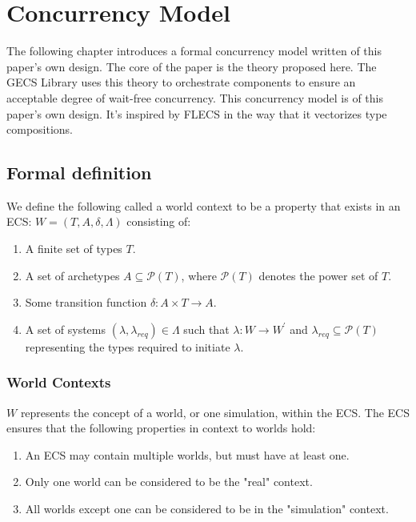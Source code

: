 
\section{Concurrency Model}
\label{chap:2}
The following chapter introduces a formal concurrency model written of this paper's own design. The core of the paper is the theory proposed here. The GECS Library uses this theory to orchestrate components to ensure an acceptable degree of wait-free concurrency. This concurrency model is of this paper's own design. It's inspired by FLECS in the way that it vectorizes type compositions.

\subsection{Formal definition} \label{section:formal_definition}
We define the following called a world context to be a property that exists in an ECS: $W = (T, A, \delta, \Lambda)$ consisting of:
\begin{enumerate}
    \item A finite set of types $T$.
    \item A set of archetypes $A \subseteq \mathcal{P}(T)$, where $\mathcal{P}(T)$ denotes the power set of $T$.
    \item Some transition function $\delta : A \times T \rightarrow A$.
    \item A set of systems $(\lambda, \lambda_{req}) \in \Lambda$ such that $\lambda : W \rightarrow W^\prime$ and $\lambda_{req} \subseteq \mathcal{P}(T)$ representing the types required to initiate $\lambda$.
\end{enumerate}

\subsubsection{World Contexts}
$W$ represents the concept of a world, or one simulation, within the ECS. The ECS ensures that the following properties in context to worlds hold:

\begin{enumerate}
    \item An ECS may contain multiple worlds, but must have at least one.
    \item Only one world can be considered to be the "real" context.
    \item All worlds except one can be considered to be in the "simulation" context.
\end{enumerate}

